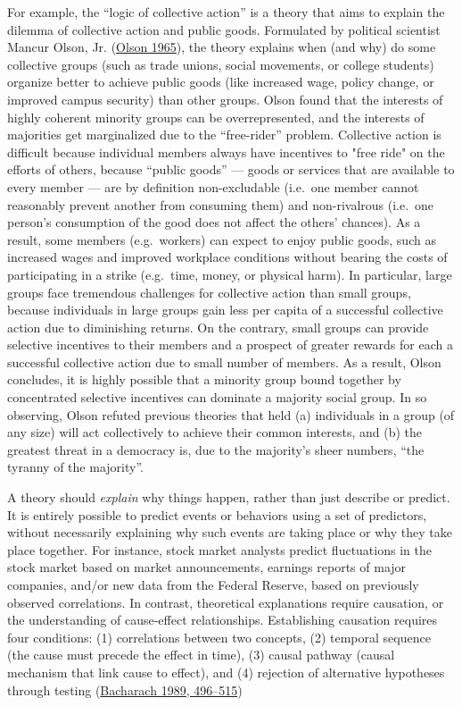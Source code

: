 \documentclass{book}
\begin{document}
For example, the ``logic of collective action'' is a theory that aims to
explain the dilemma of collective action and public goods. Formulated by
political scientist Mancur Olson, Jr.
(\protect\hyperlink{ref-olsonLogicCollectiveAction2003}{Olson 1965}), the
theory explains when (and why) do some collective groups (such as trade
unions, social movements, or college students) organize better to achieve
public goods (like increased wage, policy change, or improved campus security)
than other groups. Olson found that the interests of highly coherent minority
groups can be overrepresented, and the interests of majorities get
marginalized due to the ``free-rider'' problem. Collective action is difficult
because individual members always have incentives to "free ride" on the
efforts of others, because ``public goods'' --- goods or services that are
available to every member --- are by definition non-excludable (i.e.~one
member cannot reasonably prevent another from consuming them) and
non-rivalrous (i.e.~one person's consumption of the good does not affect the
others' chances). As a result, some members (e.g.~workers) can expect to enjoy
public goods, such as increased wages and improved workplace conditions
without bearing the costs of participating in a strike (e.g.~time, money, or
physical harm). In particular, large groups face tremendous challenges for
collective action than small groups, because individuals in large groups gain
less per capita of a successful collective action due to diminishing returns.
On the contrary, small groups can provide selective incentives to their
members and a prospect of greater rewards for each a successful collective
action due to small number of members. As a result, Olson concludes, it is
highly possible that a minority group bound together by concentrated selective
incentives can dominate a majority social group. In so observing, Olson
refuted previous theories that held (a) individuals in a group (of any size)
will act collectively to achieve their common interests, and (b) the greatest
threat in a democracy is, due to the majority's sheer numbers, ``the tyranny
of the majority''.

A theory should \emph{explain} why things happen, rather than just describe or
predict. It is entirely possible to predict events or behaviors using a set of
predictors, without necessarily explaining why such events are taking place or
why they take place together. For instance, stock market analysts predict
fluctuations in the stock market based on market announcements, earnings
reports of major companies, and/or new data from the Federal Reserve, based on
previously observed correlations. In contrast, theoretical explanations
require causation, or the understanding of cause-effect relationships.
Establishing causation requires four conditions: (1) correlations between two
concepts, (2) temporal sequence (the cause must precede the effect in time),
(3) causal pathway (causal mechanism that link cause to effect), and (4)
rejection of alternative hypotheses through testing
(\protect\hyperlink{ref-bacharachOrganizationalTheoriesCriteria}{Bacharach
1989, 496--515})
\end{document}
